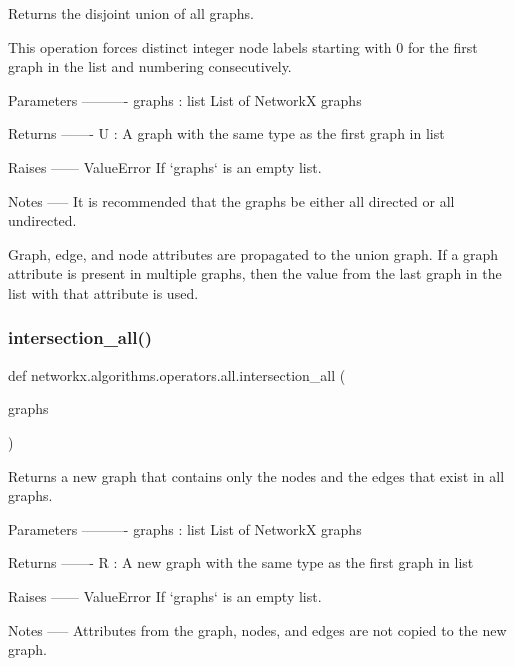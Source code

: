 \begin{DoxyVerb}Returns the disjoint union of all graphs.

This operation forces distinct integer node labels starting with 0
for the first graph in the list and numbering consecutively.

Parameters
----------
graphs : list
   List of NetworkX graphs

Returns
-------
U : A graph with the same type as the first graph in list

Raises
------
ValueError
   If `graphs` is an empty list.

Notes
-----
It is recommended that the graphs be either all directed or all undirected.

Graph, edge, and node attributes are propagated to the union graph.
If a graph attribute is present in multiple graphs, then the value
from the last graph in the list with that attribute is used.
\end{DoxyVerb}
 \mbox{\label{namespacenetworkx_1_1algorithms_1_1operators_1_1all_ace8d3d7c3693100c65c1645c3da72b72}} 
\subsubsection{\texorpdfstring{intersection\+\_\+all()}{intersection\_all()}}
{\footnotesize\ttfamily def networkx.\+algorithms.\+operators.\+all.\+intersection\+\_\+all (\begin{DoxyParamCaption}\item[{}]{graphs }\end{DoxyParamCaption})}

\begin{DoxyVerb}Returns a new graph that contains only the nodes and the edges that exist in
all graphs.

Parameters
----------
graphs : list
   List of NetworkX graphs

Returns
-------
R : A new graph with the same type as the first graph in list

Raises
------
ValueError
   If `graphs` is an empty list.

Notes
-----
Attributes from the graph, nodes, and edges are not copied to the new
graph.
\end{DoxyVerb}
 \mbox{\label{namespacenetworkx_1_1algorithms_1_1operators_1_1all_aa0df7e5fc8bf2bd495bce365727ccde7}} 
